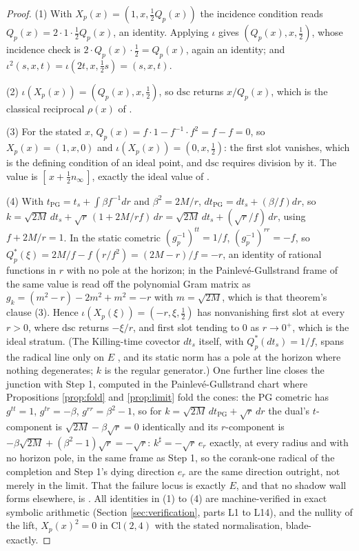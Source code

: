\documentclass[11pt]{article}
\theoremstyle{definition}
\newcommand{\Cl}{\mathrm{Cl}}
\newcommand{\er}{e_r}
\newcommand{\nInf}{n_\infty}
\newcommand{\dsc}{\mathrm{dsc}}
\begin{document}
\begin{proof}
(1) With $X_p(x) = (1, x, \tfrac12 Q_p(x))$ the incidence condition reads $Q_p(x) = 2 \cdot 1 \cdot \tfrac12 Q_p(x)$, an identity. Applying $\iota$ gives $(Q_p(x), x, \tfrac12)$, whose incidence check is $2 \cdot Q_p(x) \cdot \tfrac12 = Q_p(x)$, again an identity; and $\iota^2(s,x,t) = \iota(2t, x, \tfrac12 s) = (s, x, t)$.

(2) $\iota(X_p(x)) = (Q_p(x), x, \tfrac12)$, so $\dsc$ returns $x/Q_p(x)$, which is the classical reciprocal $\rho(x)$ of \cite[Lem.~4.23(2)]{ButlerT1}.

(3) For the stated $x$, $Q_p(x) = f \cdot 1 - f^{-1} \cdot f^2 = f - f = 0$, so $X_p(x) = (1, x, 0)$ and $\iota(X_p(x)) = (0, x, \tfrac12)$: the first slot vanishes, which is the defining condition of an ideal point, and $\dsc$ requires division by it. The value is $[\,x + \tfrac12 \nInf\,]$, exactly the ideal value of \cite[Thm.~4.10(3)]{ButlerT1}.

(4) With $t_{\mathrm{PG}} = t_s + \int \beta f^{-1}dr$ and $\beta^{2} = 2M/r$, $dt_{\mathrm{PG}} = dt_s + (\beta/f)dr$, so $k = \sqrt{2M}\,dt_s + \sqrt r\,(1 + 2M/rf)\,dr = \sqrt{2M}\,dt_s + (\sqrt r/f)\,dr$, using $f + 2M/r = 1$. In the static cometric $(g_p^{-1})^{tt} = 1/f$, $(g_p^{-1})^{rr} = -f$, so $Q^*_p(\xi) = 2M/f - f\,(r/f^{2}) = (2M - r)/f = -r$, an identity of rational functions in $r$ with no pole at the horizon; in the Painlev\'e-Gullstrand frame of \cite[Thm.~8.7]{ButlerT4} the same value is read off the polynomial Gram matrix as $g_k = (m^{2} - r) - 2m^{2} + m^{2} = -r$ with $m = \sqrt{2M}$, which is that theorem's clause (3). Hence $\iota(X_p(\xi)) = (-r, \xi, \tfrac12)$ has nonvanishing first slot at every $r > 0$, where $\dsc$ returns $-\xi/r$, and first slot tending to $0$ as $r \to 0^+$, which is the ideal stratum. (The Killing-time covector $dt_s$ itself, with $Q^*_p(dt_s) = 1/f$, spans the radical line only on $E$ \cite[Thm.~8.7(4)]{ButlerT4}, and its static norm has a pole at the horizon where nothing degenerates; $k$ is the regular generator.) One further line closes the junction with Step 1, computed in the Painlev\'e-Gullstrand chart where Propositions \ref{prop:fold} and \ref{prop:limit} fold the cones: the PG cometric has $g^{tt} = 1$, $g^{tr} = -\beta$, $g^{rr} = \beta^{2} - 1$, so for $k = \sqrt{2M}\,dt_{\mathrm{PG}} + \sqrt r\,dr$ the dual's $t$-component is $\sqrt{2M} - \beta\sqrt r = 0$ identically and its $r$-component is $-\beta\sqrt{2M} + (\beta^{2} - 1)\sqrt r = -\sqrt r$: $k^{\sharp} = -\sqrt r\,\er$ exactly, at every radius and with no horizon pole, in the same frame as Step 1, so the corank-one radical of the completion and Step 1's dying direction $\er$ are the same direction outright, not merely in the limit. That the failure locus is exactly $E$, and that no shadow wall forms elsewhere, is \cite[Thm.~8.12]{ButlerT4}. All identities in (1) to (4) are machine-verified in exact symbolic arithmetic (Section \ref{sec:verification}, parts L1 to L14), and the nullity of the lift, $X_p(x)^{2} = 0$ in $\Cl(2,4)$ with the stated normalisation, blade-exactly.
\end{proof}
\end{document}
